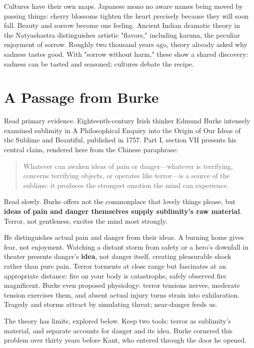 Cultures have their own maps. Japanese mono no aware names being moved by passing things: cherry blossoms tighten the heart precisely because they will soon fall. Beauty and sorrow become one feeling. Ancient Indian dramatic theory in the Natyashastra distinguishes artistic "flavors," including karuna, the peculiar enjoyment of sorrow. Roughly two thousand years ago, theory already asked why sadness tastes good. With "sorrow without harm," these show a shared discovery: sadness can be tasted and seasoned; cultures debate the recipe.

\section{A Passage from Burke}
Read primary evidence. Eighteenth-century Irish thinker Edmund Burke intensely examined sublimity in A Philosophical Enquiry into the Origin of Our Ideas of the Sublime and Beautiful, published in 1757. Part I, section VII presents his central claim, rendered here from the Chinese paraphrase:

\begin{quote}
Whatever can awaken ideas of pain or danger---whatever is terrifying, concerns terrifying objects, or operates like terror---is a source of the sublime: it produces the strongest emotion the mind can experience.
\end{quote}
Read slowly. Burke offers not the commonplace that lovely things please, but \textbf{ideas of pain and danger themselves supply sublimity's raw material}. Terror, not gentleness, excites the mind most strongly.

He distinguishes actual pain and danger from their ideas. A burning home gives fear, not enjoyment. Watching a distant storm from safety or a hero's downfall in theater presents danger's \textbf{idea}, not danger itself, creating pleasurable shock rather than pure pain. Terror torments at close range but fascinates at an appropriate distance: fire on your body is catastrophe, safely observed fire magnificent. Burke even proposed physiology: terror tensions nerves, moderate tension exercises them, and absent actual injury turns strain into exhilaration. Tragedy and storms attract by simulating threat; near-danger feeds us.

The theory has limits, explored below. Keep two tools: terror as sublimity's material, and separate accounts for danger and its idea. Burke cornered this problem over thirty years before Kant, who entered through the door he opened.


